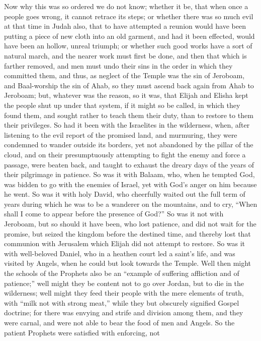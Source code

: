 Now why this was so ordered we do not know; whether it be, that
when once a people goes wrong, it cannot retrace its steps; or whether
there was so much evil at that time in Judah also, that to have
attempted a reunion would have been putting a piece of new cloth into
an old garment, and had it been effected, would have been an hollow,
unreal triumph; or whether such good works have a sort of natural
march, and the nearer work must first be done, and then that which is
farther removed, and men must undo their sins in the order in which
they committed them, and thus, as neglect of the Temple was the sin of
Jeroboam, and Baal-worship the sin of Ahab, so they must ascend back
again from Ahab to Jeroboam; but, whatever was the reason, so it was,
that Elijah and Elisha kept the people shut up under that system, if
it might so be called, in which they found them, and sought rather to
teach them their duty, than to restore to them their privileges. So
had it been with the Israelites in the wilderness, when, after
listening to the evil report of the promised land, and murmuring, they
were condemned to wander outside its borders, yet not abandoned by the
pillar of the cloud, and on their presumptuously attempting to fight
the enemy and force a passage, were beaten back, and taught to exhaust
the dreary days of the years of their pilgrimage in patience. So was
it with Balaam, who, when he tempted God, was bidden to go with the
enemies of Israel, yet with God's anger on him because he went. So
was it with holy David, who cheerfully waited out the full term of
years during which he was to be a wanderer on the mountains, and to
cry, ``When shall I come to appear before the presence of
God?'' So was it not with Jeroboam, but so should it have been,
who lost patience, and did not wait for the promise, but seized the
kingdom before the destined time, and thereby lost that communion with
Jerusalem which Elijah did not attempt to restore. So was it with
well-beloved Daniel, who in a heathen court led a saint's life, and
was visited by Angels, when he could but look towards the Temple. Well
then might the schools of the Prophets also be an ``example of
suffering affliction and of patience;'' well might they be content
not to go over Jordan, but to die in the wilderness; well might they
feed their people with the mere elements of truth, with ``milk not
with strong meat,'' while they but obscurely signified Gospel
doctrine; for there was envying and strife and division among them,
and they were carnal, and were not able to bear the food of men and
Angels. So the patient Prophets were satisfied with enforcing, not
